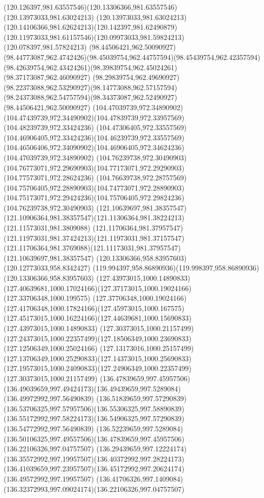 {{\curveto(120.126397,981.63557546)(120.13306366,981.63557546)(120.13973033,981.63024213)
\curveto(120.13973033,981.63024213)(120.14106366,981.62624213)(120.142397,981.62490879)
\curveto(120.11973033,981.61157546)(120.09973033,981.59824213)(120.078397,981.57824213)
\moveto(98.44506421,962.50090927)
\curveto(98.44773087,962.4742426)(98.45039754,962.44757594)(98.45439754,962.42357594)
\curveto(98.42639754,962.43424261)(98.39839754,962.45024261)(98.37173087,962.46090927)
\curveto(98.29839754,962.49690927)(98.22373088,962.53290927)(98.14773088,962.57157594)
\curveto(98.24373088,962.54757594)(98.34373087,962.52490927)(98.44506421,962.50090927)
\moveto(104.47039739,972.34890902)
\curveto(104.47439739,972.34490902)(104.47839739,972.33957569)(104.48239739,972.33424236)
\curveto(104.47306405,972.33557569)(104.46906405,972.33424236)(104.46239739,972.33557569)
\curveto(104.46506406,972.34090902)(104.46906405,972.34624236)(104.47039739,972.34890902)
\moveto(104.76239738,972.30490903)
\curveto(104.76773071,972.29690903)(104.77173071,972.29290903)(104.77573071,972.28624236)
\curveto(104.76639738,972.28757569)(104.75706405,972.28890903)(104.74773071,972.28890903)
\curveto(104.75173071,972.29424236)(104.75706405,972.29824236)(104.76239738,972.30490903)
\moveto(121.10639697,981.38357547)
\curveto(121.10906364,981.38357547)(121.11306364,981.38224213)(121.11573031,981.3809088)
\curveto(121.11706364,981.37957547)(121.11973031,981.37424213)(121.11973031,981.37157547)
\curveto(121.11706364,981.3769088)(121.11173031,981.37957547)(121.10639697,981.38357547)
\moveto(120.13306366,958.83957603)
\lineto(120.12773033,958.8342427)
\curveto(119.994397,958.86890936)(119.998397,958.86890936)(120.13306366,958.83957603)
\moveto(127.43973015,1000.14890833)
\curveto(127.40639681,1000.17024166)(127.37173015,1000.19024166)(127.33706348,1000.199575)
\curveto(127.37706348,1000.19024166)(127.41706348,1000.17824166)(127.45973015,1000.167575)
\curveto(127.45173015,1000.16224166)(127.44639681,1000.15690833)(127.43973015,1000.14890833)
\moveto(127.30373015,1000.21157499)
\curveto(127.24373015,1000.22357499)(127.18506349,1000.23690833)(127.12506349,1000.25024166)
\curveto(127.13173016,1000.25157499)(127.13706349,1000.25290833)(127.14373015,1000.25690833)
\curveto(127.19573015,1000.24090833)(127.24906349,1000.22357499)(127.30373015,1000.21157499)
\moveto(136.47839659,997.45957506)
\curveto(136.49039659,997.49424173)(136.49439659,997.5289084)(136.49972992,997.56490839)
\curveto(136.51839659,997.57290839)(136.53706325,997.57957506)(136.55306325,997.58890839)
\curveto(136.55172992,997.58224173)(136.54906325,997.57290839)(136.54772992,997.56490839)
\curveto(136.52239659,997.5289084)(136.50106325,997.49557506)(136.47839659,997.45957506)
\moveto(136.22106326,997.04757507)
\curveto(136.29439659,997.12224174)(136.35572992,997.19957507)(136.40372992,997.28224173)
\curveto(136.41039659,997.23957507)(136.45172992,997.20624174)(136.49572992,997.19957507)
\curveto(136.41706326,997.1409084)(136.32372993,997.09024174)(136.22106326,997.04757507)
}
}
